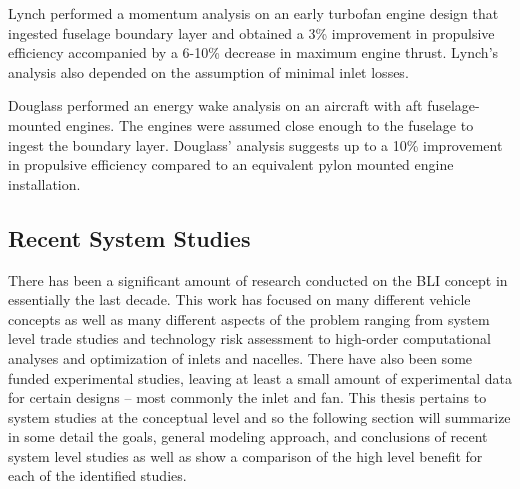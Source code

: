 Lynch \cite{Lynch1960} performed a momentum analysis on an early turbofan engine design that ingested fuselage boundary layer and obtained a 3\% improvement in propulsive efficiency accompanied by a 6-10\% decrease in maximum engine thrust. Lynch’s analysis also depended on the assumption of minimal inlet losses.

Douglass \cite{Douglass1970} performed an energy wake analysis on an aircraft with aft fuselage-mounted engines. The engines were assumed close enough to the fuselage to ingest the boundary layer. Douglass’ analysis suggests up to a 10\% improvement in propulsive efficiency compared to an equivalent pylon mounted engine installation. 

\subsection{Recent System Studies}
There has been a significant amount of research conducted on the BLI concept in essentially the last decade.  This work has focused on many different vehicle concepts as well as many different aspects of the problem ranging from system level trade studies and technology risk assessment to high-order computational analyses and optimization of inlets and nacelles.  There have also been some funded experimental studies, leaving at least a small amount of experimental data for certain designs -- most commonly the inlet and fan.  This thesis pertains to system studies at the conceptual level and so the following section will summarize in some detail the goals, general modeling approach, and conclusions of recent system level studies as well as show a comparison of the high level benefit for each of the identified studies.  

